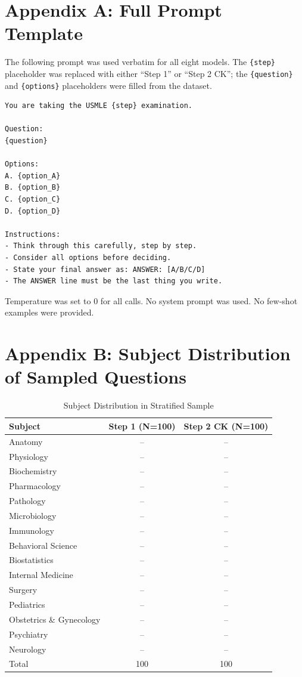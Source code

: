 \section{Appendix A: Full Prompt Template}

The following prompt was used verbatim for all eight models. The \texttt{\{step\}} placeholder was replaced with either ``Step 1'' or ``Step 2 CK''; the \texttt{\{question\}} and \texttt{\{options\}} placeholders were filled from the dataset.

\begin{verbatim}
You are taking the USMLE {step} examination.

Question:
{question}

Options:
A. {option_A}
B. {option_B}
C. {option_C}
D. {option_D}

Instructions:
- Think through this carefully, step by step.
- Consider all options before deciding.
- State your final answer as: ANSWER: [A/B/C/D]
- The ANSWER line must be the last thing you write.
\end{verbatim}

Temperature was set to 0 for all calls. No system prompt was used. No few-shot examples were provided.

\section{Appendix B: Subject Distribution of Sampled Questions}

\begin{table}[htbp]
\centering
\caption{Subject Distribution in Stratified Sample}
\label{tab:subject_distribution}
\begin{tabular}{lcc}
\toprule
Subject & Step 1 (N=100) & Step 2 CK (N=100) \\
\midrule
Anatomy & -- & -- \\
Physiology & -- & -- \\
Biochemistry & -- & -- \\
Pharmacology & -- & -- \\
Pathology & -- & -- \\
Microbiology & -- & -- \\
Immunology & -- & -- \\
Behavioral Science & -- & -- \\
Biostatistics & -- & -- \\
Internal Medicine & -- & -- \\
Surgery & -- & -- \\
Pediatrics & -- & -- \\
Obstetrics \& Gynecology & -- & -- \\
Psychiatry & -- & -- \\
Neurology & -- & -- \\
\midrule
Total & 100 & 100 \\
\bottomrule
\end{tabular}
\end{table}

